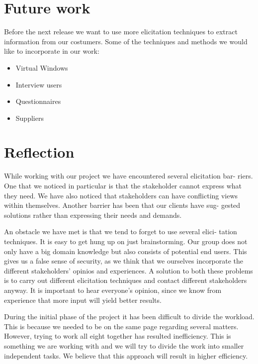 \documentclass[a4paper]{article}
\begin{document}
  \section{Future work}
Before the next release we want to use more elicitation techniques to extract
information from our costumers. Some of the techniques and methods we would
like to incorporate in our work:

  \begin{itemize}
  	\item Virtual Windows
  	\item Interview users
  	\item Questionnaires
  	\item Suppliers 
  \end{itemize}
 
  \section{Reflection}

While working with our project we have encountered several elicitation bar-
riers. One that we noticed in particular is that the stakeholder cannot express
what they need. We have also noticed that stakeholders can have conflicting
views within themselves. Another barrier has been that our clients have sug-
gested solutions rather than expressing their needs and demands.

An obstacle we have met is that we tend to forget to use several elici-
tation techniques. It is easy to get hung up on just brainstorming. Our group
does not only have a big domain knowledge but also consists of potential end
users. This gives us a false sense of security, as we think that we ourselves
incorporate the different stakeholders’ opinios and experiences. A solution to
both these problems is to carry out different elicitation techniques and contact
different stakeholders anyway. It is important to hear everyone’s opinion, since
we know from experience that more input will yield better results.

During the initial phase of the project it has been difficult to divide the
workload. This is because we needed to be on the same page regarding several
matters. However, trying to work all eight together has resulted inefficiency.
This is something we are working with and we will try to divide the work into
smaller independent tasks. We believe that this approach will result in higher
efficiency.
\end{document}
